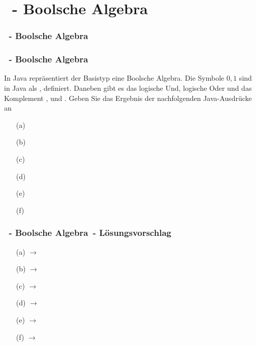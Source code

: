 \def\stitle{\theexercise\ - Boolsche Algebra}
\section{\stitle}
\begin{frame}
    \frametitle{\stitle}%
\tableofcontents[current]
\end{frame}

\begin{frame}[t]
  \frametitle{\stitle}


In Java repräsentiert der Basistyp  eine Boolsche Algebra.
Die Symbole $0, 1$ sind in Java als ,  definiert.
Daneben gibt es das logische Und, logische Oder und das Komplement \code{\&\&}, \code{||} und \code{!}.
Geben Sie das Ergebnis der nachfolgenden Java-Ausdrücke an
\medskip

\begin{minipage}{0.49\textwidth}
\begin{itemize}
\item[(a)] 
\item[(b)] 
\item[(c)] 
\end{itemize}
\end{minipage}
\begin{minipage}{0.49\textwidth}
\begin{itemize}
\item[(d)] 
\item[(e)] 
\item[(f)] 
\end{itemize}
\end{minipage}
\end{frame}

\begin{frame}[t]
  \frametitle{\stitle\ - L\"osungsvorschlag}
\begin{center}
\begin{minipage}{0.49\textwidth}
\begin{itemize}
\item[(a)]       $\rightarrow$ 
\item[(b)]       $\rightarrow$ 
\item[(c)] $\rightarrow$ 
\end{itemize}
\end{minipage}
\begin{minipage}{0.49\textwidth}
\begin{itemize}
\item[(d)] $\rightarrow$ 
\item[(e)]              $\rightarrow$ 
\item[(f)]    $\rightarrow$ 
\end{itemize}
\end{minipage}
\end{center}

\end{frame}
